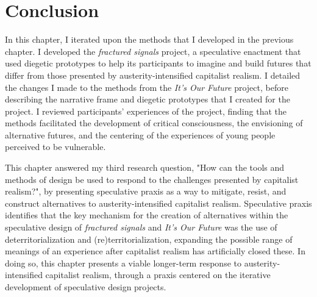 \section{Conclusion}
In this chapter, I iterated upon the methods that I developed in the previous chapter. I developed the \textit{fractured signals} project, a speculative enactment that used diegetic prototypes to help its participants to imagine and build futures that differ from those presented by austerity-intensified capitalist realism. I detailed the changes I made to the methods from the \textit{It's Our Future} project, before describing the narrative frame and diegetic prototypes that I created for the project. I reviewed participants' experiences of the project, finding that the methods facilitated the development of critical consciousness, the envisioning of alternative futures, and the centering of the experiences of young people perceived to be vulnerable.

This chapter answered my third research question, "How can the tools and methods of design be used to respond to the challenges presented by capitalist realism?", by presenting speculative praxis as a way to mitigate, resist, and construct alternatives to austerity-intensified capitalist realism. Speculative praxis identifies that the key mechanism for the creation of alternatives within the speculative design of \textit{fractured signals} and \textit{It's Our Future} was the use of deterritorialization and (re)territorialization, expanding the possible range of meanings of an experience after capitalist realism has artificially closed these. In doing so, this chapter presents a viable longer-term response to austerity-intensified capitalist realism, through a praxis centered on the iterative development of speculative design projects. 